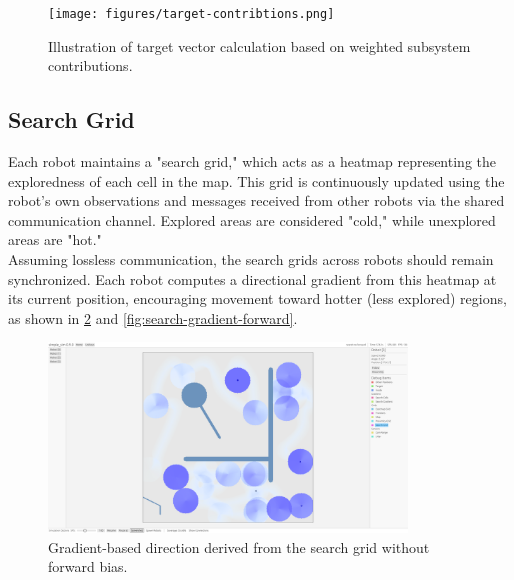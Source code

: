 \begin{figure}[H]
    \begin{center}
        \texttt{[image: figures/target-contribtions.png]}
    \end{center}
    \caption{Illustration of target vector calculation based on weighted subsystem contributions.}
    \label{fig:target-contributions}
\end{figure}

\subsection{Search Grid}

Each robot maintains a "search grid," which acts as a heatmap representing the exploredness of each cell in the map. This grid is continuously updated using the robot’s own observations and messages received from other robots via the shared communication channel. Explored areas are considered "cold," while unexplored areas are "hot."\\

Assuming lossless communication, the search grids across robots should remain synchronized. Each robot computes a directional gradient from this heatmap at its current position, encouraging movement toward hotter (less explored) regions, as shown in \cref{fig:search-gradient-no-forward} and \cref{fig:search-gradient-forward}.

\begin{figure}[H]
    \begin{center}
        \includegraphics[width=0.85\textwidth]{./figures/screenshots/no-forward.png}
    \end{center}
    \caption{Gradient-based direction derived from the search grid without forward bias.}
    \label{fig:search-gradient-no-forward}
\end{figure}

